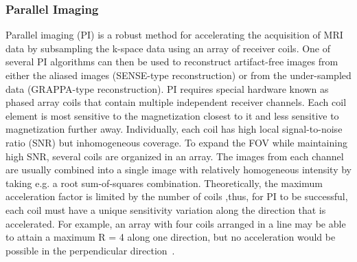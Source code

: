 \subsubsection{Parallel Imaging}
Parallel imaging (PI) is a robust method for accelerating the acquisition of MRI data by subsampling the k-space data using an array of receiver coils. One of several PI algorithms can then be used to reconstruct artifact-free images from either the aliased images (SENSE-type reconstruction) or from the under-sampled data (GRAPPA-type reconstruction). PI requires special hardware known as phased array coils that 
contain multiple independent receiver channels. Each coil element is most sensitive to the magnetization closest to it and less sensitive to magnetization further away. 
Individually, each coil has high local signal-to-noise ratio (SNR) but inhomogeneous coverage. To expand the FOV while maintaining high SNR, several coils are organized in an array. The images from each channel are usually combined into a single image with relatively homogeneous intensity by taking e.g. a root sum-of-squares combination.
Theoretically, the maximum acceleration factor is limited by the number of coils
,thus, for PI to be successful, each coil must have a unique sensitivity variation along the direction that is accelerated. For example, an array with four coils arranged in a line may be able to attain a maximum R = 4 along one direction, but no acceleration would be possible in the perpendicular direction~\cite{AdvancesPI}.\\
